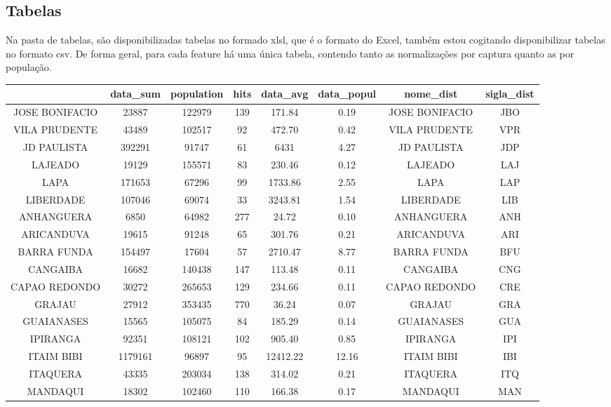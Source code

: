 \documentclass{article}
\begin{document}
\subsection{Tabelas}
\par
Na pasta de tabelas, são disponibilizadas tabelas no formado xlsl, que é o formato do Excel,
também estou cogitando disponibilizar tabelas no formato csv. De forma geral, para cada feature
há uma única tabela, contendo tanto as normalizações por captura quanto as por população.

\begin{table}[H]
\small
\begin{tabular}{ c|c c c c c c c }
 & data\_sum & population & hits & data\_avg & data\_popul & nome\_dist & sigla\_dist \\
\hline
JOSE BONIFACIO & 23887 & 122979 & 139 & 171.84 & 0.19 & JOSE BONIFACIO & JBO \\
VILA PRUDENTE & 43489 & 102517 & 92 & 472.70 & 0.42 & VILA PRUDENTE & VPR \\
JD PAULISTA & 392291 & 91747 & 61 & 6431 & 4.27 & JD PAULISTA & JDP \\
LAJEADO & 19129 & 155571 & 83 & 230.46 & 0.12 & LAJEADO & LAJ \\
LAPA & 171653 & 67296 & 99 & 1733.86 & 2.55 & LAPA & LAP \\
LIBERDADE & 107046 & 69074 & 33 & 3243.81 & 1.54 & LIBERDADE & LIB \\
ANHANGUERA & 6850 & 64982 & 277 & 24.72 & 0.10 & ANHANGUERA & ANH \\
ARICANDUVA & 19615 & 91248 & 65 & 301.76 & 0.21 & ARICANDUVA & ARI \\
BARRA FUNDA & 154497 & 17604 & 57 & 2710.47 & 8.77 & BARRA FUNDA & BFU \\
CANGAIBA & 16682 & 140438 & 147 & 113.48 & 0.11 & CANGAIBA & CNG \\
CAPAO REDONDO & 30272 & 265653 & 129 & 234.66 & 0.11 & CAPAO REDONDO & CRE \\
GRAJAU & 27912 & 353435 & 770 & 36.24 & 0.07 & GRAJAU & GRA \\
GUAIANASES & 15565 & 105075 & 84 & 185.29 & 0.14 & GUAIANASES & GUA \\
IPIRANGA & 92351 & 108121 & 102 & 905.40 & 0.85 & IPIRANGA & IPI \\
ITAIM BIBI & 1179161 & 96897 & 95 & 12412.22 & 12.16 & ITAIM BIBI & IBI \\
ITAQUERA & 43335 & 203034 & 138 & 314.02 & 0.21 & ITAQUERA & ITQ \\
MANDAQUI & 18302 & 102460 & 110 & 166.38 & 0.17 & MANDAQUI & MAN \\

\end{tabular}
\end{table}
\end{document}
